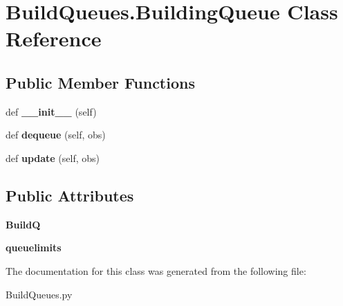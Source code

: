 \hypertarget{classBuildQueues_1_1BuildingQueue}{}\section{Build\+Queues.\+Building\+Queue Class Reference}
\label{classBuildQueues_1_1BuildingQueue}
\subsection*{Public Member Functions}
\begin{DoxyCompactItemize}
\item 
def {\bfseries \+\_\+\+\_\+init\+\_\+\+\_\+} (self)\hypertarget{classBuildQueues_1_1BuildingQueue_a8008ce704e249c97c5b01b62804d801f}{}\label{classBuildQueues_1_1BuildingQueue_a8008ce704e249c97c5b01b62804d801f}

\item 
def {\bfseries dequeue} (self, obs)\hypertarget{classBuildQueues_1_1BuildingQueue_a52d960e806a6ed6eef1cc5765bb2d71e}{}\label{classBuildQueues_1_1BuildingQueue_a52d960e806a6ed6eef1cc5765bb2d71e}

\item 
def {\bfseries update} (self, obs)\hypertarget{classBuildQueues_1_1BuildingQueue_a80abaeb74b2e85535810a03950cc1018}{}\label{classBuildQueues_1_1BuildingQueue_a80abaeb74b2e85535810a03950cc1018}

\end{DoxyCompactItemize}
\subsection*{Public Attributes}
\begin{DoxyCompactItemize}
\item 
{\bfseries BuildQ}\hypertarget{classBuildQueues_1_1BuildingQueue_a4dfe00f1a7deb14a5686e6e26559427d}{}\label{classBuildQueues_1_1BuildingQueue_a4dfe00f1a7deb14a5686e6e26559427d}

\item 
{\bfseries queuelimits}\hypertarget{classBuildQueues_1_1BuildingQueue_a4fbbb181b46cc93ec8ab40110691ce9c}{}\label{classBuildQueues_1_1BuildingQueue_a4fbbb181b46cc93ec8ab40110691ce9c}

\end{DoxyCompactItemize}


The documentation for this class was generated from the following file\+:\begin{DoxyCompactItemize}
\item 
Build\+Queues.\+py\end{DoxyCompactItemize}
